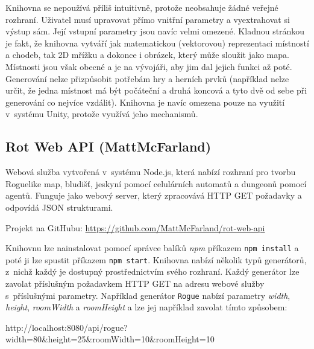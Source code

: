 \par
Knihovna se nepoužívá příliš intuitivně, protože neobsahuje žádné veřejné rozhraní.
Uživatel musí upravovat přímo vnitřní parametry a vyextrahovat si výstup sám.
Její vstupní parametry jsou navíc velmi omezené.
Kladnou stránkou je fakt, že knihovna vytváří jak matematickou (vektorovou) reprezentaci místností a chodeb, tak 2D mřížku a dokonce i obrázek, který může sloužit jako mapa.
Místnosti jsou však obecné a je na vývojáři, aby jim dal jejich funkci až poté.
Generování nelze přizpůsobit potřebám hry a herních prvků (například nelze určit, že jedna místnost má být počáteční a druhá koncová a tyto dvě od sebe při generování co nejvíce vzdálit).
Knihovna je navíc omezena pouze na využití v~systému Unity, protože využívá jeho mechanismů.


\subsection{Rot Web API (MattMcFarland)}
\label{ssec:rotwebapi}


Webová služba vytvořená v~systému Node.js, která nabízí rozhraní pro tvorbu Roguelike map, bludišť, jeskyní pomocí celulárních automatů a dungeonů pomocí agentů.
Funguje jako webový server, který zpracovává HTTP GET požadavky a odpovídá JSON strukturami.\medskip

\noindent Projekt na GitHubu: \url{https://github.com/MattMcFarland/rot-web-api}\medskip

Knihovnu lze nainstalovat pomocí správce balíků \textit{npm} příkazem \texttt{npm install} a poté ji lze spustit příkazem \texttt{npm start}.
Knihovna nabízí několik typů generátorů, z~nichž každý je dostupný prostřednictvím svého rozhraní.
Každý generátor lze zavolat příslušným požadavkem HTTP GET na adresu webové služby s~příslušnými parametry.
Například generátor \texttt{Rogue} nabízí parametry \textit{width}, \textit{height}, \textit{roomWidth} a \textit{roomHeight} a lze jej například zavolat tímto způsobem:\medskip

\noindent \begin{texttt}http://localhost:8080/api/rogue?width=80\&height=25\&roomWidth=10\&roomHeight=10\end{texttt}\medskip

